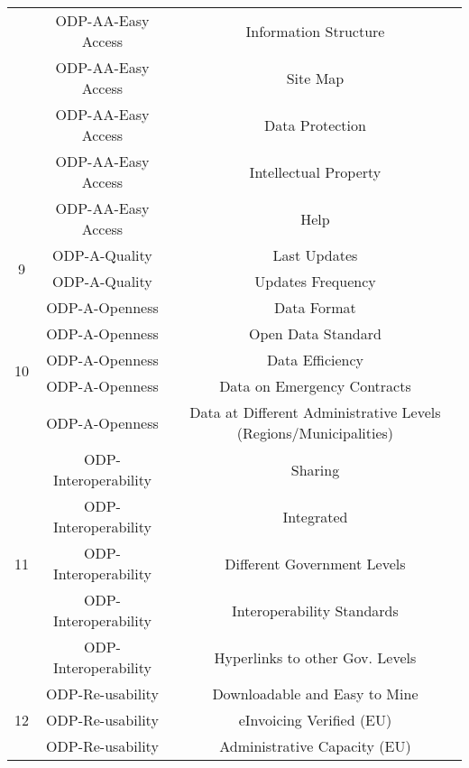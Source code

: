 \documentclass[a4paper, twoside]{report}
\begin{document}
\begin{table}[htbp]
\begin{adjustbox}{max width=\linewidth}
\begin{tabular}{ccc}
          & ODP-AA-Easy Access & Information Structure \\
          & ODP-AA-Easy Access & Site Map \\
          & ODP-AA-Easy Access & Data Protection \\
          & ODP-AA-Easy Access & Intellectual Property \\
          & ODP-AA-Easy Access & Help \\
    \midrule
    \multirow{2}[2]{*}{9} & \cellcolor[rgb]{ .851,  .851,  .851}ODP-A-Quality & \cellcolor[rgb]{ .851,  .851,  .851}Last Updates \\
          & \cellcolor[rgb]{ .851,  .851,  .851}ODP-A-Quality & \cellcolor[rgb]{ .851,  .851,  .851}Updates Frequency \\
    \midrule
    \multirow{5}[2]{*}{10} & ODP-A-Openness & Data Format \\
          & \cellcolor[rgb]{ .851,  .851,  .851}ODP-A-Openness & \cellcolor[rgb]{ .851,  .851,  .851}Open Data Standard \\
          & ODP-A-Openness & Data Efficiency \\
          & \cellcolor[rgb]{ .851,  .851,  .851}ODP-A-Openness & \cellcolor[rgb]{ .851,  .851,  .851}Data on Emergency Contracts \\
          & \cellcolor[rgb]{ .851,  .851,  .851}ODP-A-Openness & \cellcolor[rgb]{ .851,  .851,  .851}Data at Different Administrative Levels (Regions/Municipalities) \\
    \midrule
    \multirow{5}[2]{*}{11} & ODP-Interoperability & Sharing \\
          & ODP-Interoperability & Integrated \\
          & ODP-Interoperability & Different Government Levels \\
          & \cellcolor[rgb]{ .851,  .851,  .851}ODP-Interoperability & \cellcolor[rgb]{ .851,  .851,  .851}Interoperability Standards \\
          & \cellcolor[rgb]{ .851,  .851,  .851}ODP-Interoperability & \cellcolor[rgb]{ .851,  .851,  .851}Hyperlinks to other Gov. Levels \\
    \midrule
    \multirow{8}[2]{*}{12} & ODP-Re-usability & Downloadable and Easy to Mine \\
          & \cellcolor[rgb]{ .851,  .851,  .851}ODP-Re-usability & \cellcolor[rgb]{ .851,  .851,  .851}eInvoicing Verified (EU) \\
          & ODP-Re-usability & Administrative Capacity (EU) \\

\end{tabular}
\end{adjustbox}
\end{table}
\end{document}
